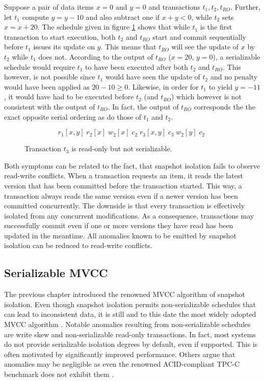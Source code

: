 Suppose a pair of data items $x = 0$ and $y = 0$ and transactions $t_1, t_2,
t_{RO}$. Further, let $t_1$ compute $y = y - 10$ and also subtract one if $x + y <
0$, while $t_2$ sets $x = x + 20$. The schedule given in figure
\ref{fig:bad_read_only} shows that while $t_1$ is the first transaction to start
execution, both $t_2$ and $t_{RO}$ start and commit sequentially before $t_1$
issues its update on $y$. This means that $t_{RO}$ will see the update of $x$ by
$t_2$ while $t_1$ does not. According to the output of $t_{RO}$ ($x = 20$, $y =
0$), a serializable schedule would require $t_1$ to have been executed after
both $t_2$ and $t_{RO}$. This however, is not possible since $t_1$ would have
seen the update of $t_2$ and no penalty would have been applied as $20 - 10 \geq
0$. Likewise, in order for $t_1$ to yield $y = -11$, it would have had to be
executed before $t_2$ (and $t_{RO}$) which however is not consistent with the
output of $t_{RO}$. In fact, the output of $t_{RO}$ corresponds the the exact
opposite serial ordering as do those of $t_1$ and $t_2$.

\begin{figure}[h!]
    \centering
    \[
        r_1[x,y]\; r_2[x]\; w_2[x]\; c_2\; r_3[x,y]\; c_3\; w_2[y]\; c_2\;
    \]
    \caption{Transaction $t_3$ is read-only but not serializable.}
    \label{fig:bad_read_only}
\end{figure}

Both symptoms can be related to the fact, that snapshot isolation fails to
observe read-write conflicts. When a transaction requests an item, it reads the
latest version that has been committed before the transaction started. This way,
a transaction always reads the same version even if a newer version has been
committed concurrently. The downside is that every transaction is effectively
isolated from any concurrent modifications. As a consequence, transactions may
successfully commit even if one or more versions they have read has been updated
in the meantime. All anomalies known to be emitted by snapshot isolation can be
reduced to read-write conflicts.

\subsection{Serializable MVCC}

The previous chapter introduced the renowned MVCC algorithm of snapshot
isolation. Even though snapshot isolation permits non-serializable schedules
that can lead to inconsistent data, it is still and to this date the most widely
adopted MVCC algorithm \cite{cahill2009serializable, larson2011high,
sikka2012efficient, neumann2015fast}. Notable anomalies resulting from
non-serializable schedules are write skew and non-serializable read-only
transactions. In fact, most systems do not provide serializable isolation
degrees by default, even if supported. This is often motivated by significantly
improved performance. Others argue that anomalies may be negligible as even the
renowned ACID-compliant TPC-C benchmark does not exhibit them
\cite{fekete2005making}.

